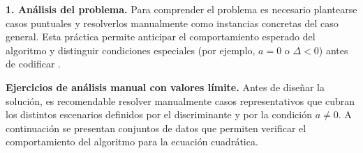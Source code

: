 \documentclass[12pt,twoside]{book}
\begin{document}
						\noindent
						\textbf{1. Análisis del problema.} Para comprender el problema es necesario plantearse casos puntuales y resolverlos manualmente como instancias concretas del caso general. Esta práctica permite anticipar el comportamiento esperado del algoritmo y distinguir condiciones especiales (por ejemplo, $a=0$ o $\Delta<0$) antes de codificar \cite{Gaddis2022Starting,Farrell2018Programming}.
						
						\noindent
						\textbf{Ejercicios de análisis manual con valores límite.}
						Antes de diseñar la solución, es recomendable resolver manualmente casos representativos que cubran los distintos escenarios definidos por el discriminante y por la condición $a\neq 0$. A continuación se presentan conjuntos de datos que permiten verificar el comportamiento del algoritmo para la ecuación cuadrática.
						
\end{document}
